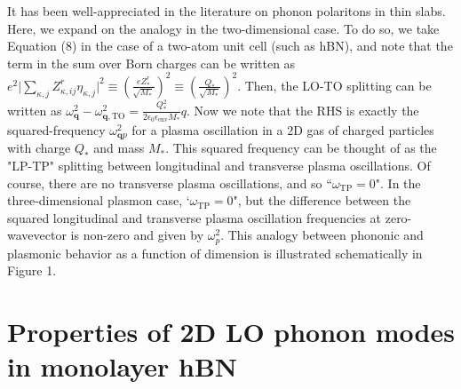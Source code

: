 \documentclass[aps,prb,twocolumn,
	groupedaddress,superscriptaddress,
	amsfonts,amssymb,amsmath,floatfix,
	citeautoscript]{revtex4-1}
\begin{document}
It has been well-appreciated in the literature on phonon polaritons in thin slabs. Here, we expand on the analogy in the two-dimensional case. To do so, we take Equation (8) in the case of a two-atom unit cell (such as hBN), and note that the term in the sum over Born charges can be written as $e^2\Big|\sum\limits_{\kappa,j}Z^r_{\kappa,ij}\eta_{\kappa,j}  \Big|^2 \equiv  \left(\frac{eZ^r_*}{\sqrt{M_*}}\right)^2 \equiv \left(\frac{Q_*}{\sqrt{M_*}}\right)^2$. Then, the LO-TO splitting can be written as $\omega^2_{\mathbf{q}} - \omega^2_{\mathbf{q},\mathrm{TO}} = \frac{Q_*^2}{2\epsilon_0\epsilon_{\mathrm{env}} M_*}q$. Now we note that the RHS is exactly the squared-frequency $\omega^2_{\mathbf{q}p}$ for a plasma oscillation in a 2D gas of charged particles with charge $Q_*$ and mass $M_*$. This squared frequency can be thought of as the "LP-TP" splitting between longitudinal and transverse plasma oscillations. Of course, there are no transverse plasma oscillations, and so ``$\omega_{\mathrm{TP}} = 0$". In the three-dimensional plasmon case, `$\omega_{\mathrm{TP}} = 0$", but the difference between the squared longitudinal and transverse plasma oscillation frequencies at zero-wavevector is non-zero and given by $\omega_p^2$. This analogy between phononic and plasmonic behavior as a function of dimension is illustrated schematically in Figure 1.

\section{Properties of 2D LO phonon modes in monolayer hBN}
\end{document}
